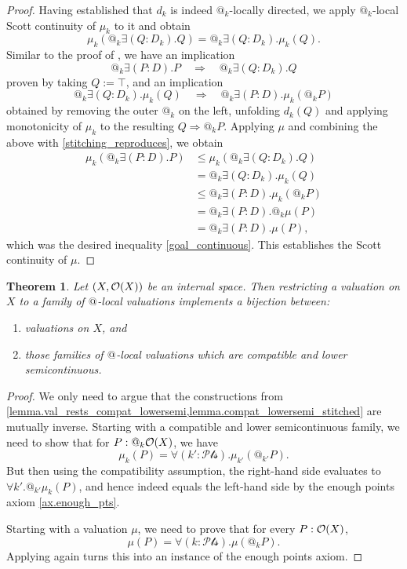 \documentclass[11pt, oneside, article]{memoir}
\makeatletter
\theoremstyle{plain}
\newtheorem{theorem}{Theorem}[chapter] %
\theoremstyle{definition}
\theoremstyle{remark}
\newcommand{\Op}[1][undef]{\ifthenelse{\equal{#1}{undef}}{\mathcal{O}}{\mathcal{O}(#1)}}
\newcommand{\pt}{k}				%
\newcommand{\Pts}{\mathcal{Pts}}		%
\newcommand{\AtSymbol}{{@}}
\newcommand{\At}[1][\pt]{\AtSymbol_{#1}}
\newcommand{\imp}{\Rightarrow}
\makeatother
\begin{document}
\begin{proof}
	Having established that $d_k$ is indeed $\At$-locally directed, we apply $\At$-local Scott continuity of $\mu_\pt$ to it and obtain
\[
		\mu_\pt\left( \At \exists (Q : D_\pt). Q \right) = 
		\At \exists (Q : D_\pt) . \mu_\pt(Q).
\]
	Similar to the proof of , we have an implication
	\[
		\At \exists (P : D). P \quad \Longrightarrow \quad \At \exists (Q : D_\pt) . Q
	\]
	proven by taking $Q := \top$, and an implication
	\[
		\At \exists (Q : D_\pt) . \mu_\pt(Q) \quad \Longrightarrow \quad \At \exists (P : D) . \mu_\pt(\At P)
	\]
	obtained by removing the outer $\At$ on the left, unfolding $d_\pt(Q)$ and applying monotonicity of $\mu_\pt$ to the resulting $Q \imp \At P$. Applying $\mu$ and combining the above with \eqref{stitching_reproduces}, we obtain
	\begin{align*}
			\mu_\pt(\At \exists (P : D) . P) &\le
			\mu_\pt(\At \exists (Q : D_k). Q)\\&=
			\At \exists (Q : D_\pt).\mu_\pt(Q)\\&\leq
			\At \exists (P : D). \mu_\pt(\At P)\\&=
			\At \exists (P : D). \At\mu(P)\\&=
			\At \exists (P : D). \mu(P),
  \end{align*}
which was the desired inequality \eqref{goal_continuous}. This establishes the Scott continuity of $\mu$.
\end{proof}

\begin{theorem}
	\label{main_internal}
	Let $(X,\Op[X])$ be an internal space. Then restricting a valuation on $X$ to a family of $\At[]$-local valuations implements a bijection between:
	\begin{enumerate}
		\item valuations on $X$, and
		\item those families of $\At[]$-local valuations which are compatible and lower semicontinuous.
	\end{enumerate}
\end{theorem}

\begin{proof}
	We only need to argue that the constructions from \cref{lemma.val_rests_compat_lowersemi,lemma.compat_lowersemi_stitched} are mutually inverse. Starting with a compatible and lower semicontinuous family, we need to show that for $P : \At \Op[X]$, we have
	\[
		\mu_\pt(P) = \forall (\pt' : \Pts) . \mu_{\pt'}( \At[\pt'] P).
	\]
	But then using the compatibility assumption, the right-hand side evaluates to $\forall \pt' . \At[\pt'] \mu_\pt(P)$, and hence indeed equals the left-hand side by the enough points axiom \ref{ax.enough_pts}.

	Starting with a valuation $\mu$, we need to prove that for every $P : \Op[X]$,
	\[
		\mu(P) = \forall (\pt : \Pts) . \mu(\At P).
	\]
	Applying  again turns this into an instance of the enough points axiom.
\end{proof}
\end{document}

